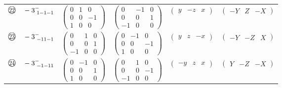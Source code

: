 \documentclass[fleqn,10pt,landscape]{jsarticle}
\begin{document}
\begin{center}
\begin{longtable}{lcccc}
$ {\ooalign{\hfil\resizebox{.8\width}{\height}{22}\hfil\crcr\raise.1ex\hbox{\large$\bigcirc$}}}\quad -3^{-}_{\,\,1-1-1} $ & $ \begin{pmatrix} 0 & 1 & 0 \\ 0 & 0 & -1 \\ 1 & 0 & 0 \end{pmatrix} $ & $ \begin{pmatrix} 0 & -1 & 0 \\ 0 & 0 & 1 \\ -1 & 0 & 0 \end{pmatrix} $ & $ \begin{pmatrix} y & - z & x \end{pmatrix} $ & $ \begin{pmatrix} - Y & Z & - X \end{pmatrix} $ \\
$ {\ooalign{\hfil\resizebox{.8\width}{\height}{23}\hfil\crcr\raise.1ex\hbox{\large$\bigcirc$}}}\quad -3^{-}_{\,\,-11-1} $ & $ \begin{pmatrix} 0 & 1 & 0 \\ 0 & 0 & 1 \\ -1 & 0 & 0 \end{pmatrix} $ & $ \begin{pmatrix} 0 & -1 & 0 \\ 0 & 0 & -1 \\ 1 & 0 & 0 \end{pmatrix} $ & $ \begin{pmatrix} y & z & - x \end{pmatrix} $ & $ \begin{pmatrix} - Y & - Z & X \end{pmatrix} $ \\
$ {\ooalign{\hfil\resizebox{.8\width}{\height}{24}\hfil\crcr\raise.1ex\hbox{\large$\bigcirc$}}}\quad -3^{-}_{\,\,-1-11} $ & $ \begin{pmatrix} 0 & -1 & 0 \\ 0 & 0 & 1 \\ 1 & 0 & 0 \end{pmatrix} $ & $ \begin{pmatrix} 0 & 1 & 0 \\ 0 & 0 & -1 \\ -1 & 0 & 0 \end{pmatrix} $ & $ \begin{pmatrix} - y & z & x \end{pmatrix} $ & $ \begin{pmatrix} Y & - Z & - X \end{pmatrix} $ \\
\end{longtable}
\end{center}
\end{document}
